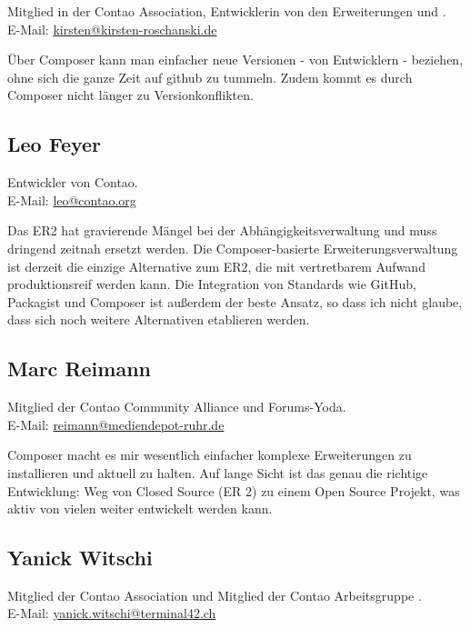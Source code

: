 \documentclass[
paper=a4,
draft=false,%
fontsize=10pt%
]{scrartcl}
\begin{document}
Mitglied in der Contao Association, Entwicklerin von den Erweiterungen  und .\\
E-Mail: \href{mailto:kirsten@kirsten-roschanski.de}{kirsten@kirsten-roschanski.de}

Über Composer kann man einfacher neue Versionen - von Entwicklern - beziehen, ohne sich die ganze Zeit auf github zu tummeln. Zudem kommt es durch Composer nicht länger zu Versionkonflikten.

\pagebreak

\subsection*{Leo  Feyer}

Entwickler von Contao.\\
E-Mail: \href{mailto:leo@contao.org}{leo@contao.org}

Das ER2 hat gravierende Mängel bei der Abhängigkeitsverwaltung und muss dringend zeitnah ersetzt werden. Die Composer-basierte Erweiterungsverwaltung ist derzeit die einzige Alternative zum ER2, die mit vertretbarem Aufwand produktionsreif werden kann. Die Integration von Standards wie GitHub, Packagist und Composer ist außerdem der beste Ansatz, so dass ich nicht glaube, dass sich noch weitere Alternativen etablieren werden.

\subsection*{Marc  Reimann}

Mitglied der Contao Community Alliance und Forums-Yoda.\\
E-Mail: \href{mailto:reimann@mediendepot-ruhr.de}{reimann@mediendepot-ruhr.de}

Composer macht es mir wesentlich einfacher komplexe Erweiterungen zu installieren und aktuell zu halten. Auf lange Sicht ist das genau die richtige Entwicklung: Weg von Closed Source (ER 2) zu einem Open Source Projekt, was aktiv von vielen weiter entwickelt werden kann.

\subsection*{Yanick  Witschi}

Mitglied der Contao Association und Mitglied der Contao Arbeitsgruppe .\\
E-Mail: \href{mailto:yanick.witschi@terminal42.ch}{yanick.witschi@terminal42.ch}
\end{document}
